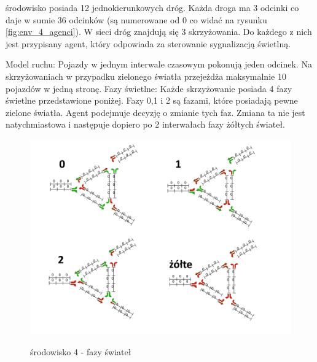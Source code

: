 \documentclass[12pt]{book}
\theoremstyle{plain}
\begin{document}
środowisko posiada 12 jednokierunkowych dróg. Każda droga ma 3 odcinki co daje w sumie 36 odcinków (są numerowane od 0 co widać na rysunku \ref{fig:env_4_agenci}).
W sieci dróg znajdują się 3 skrzyżowania. Do każdego z nich jest przypisany agent, który odpowiada za sterowanie sygnalizacją świetlną.

Model ruchu:
Pojazdy w jednym interwale czasowym pokonują jeden odcinek. Na skrzyżowaniach w przypadku zielonego światła przejeżdża maksymalnie 10 pojazdów w jedną stronę.
Fazy świetlne: Każde skrzyżowanie posiada 4 fazy świetlne przedstawione poniżej. Fazy 0,1 i 2 są fazami, które posiadają pewne zielone światła. Agent podejmuje decyzję o zmianie tych faz. Zmiana ta nie jest natychmiastowa i następuje dopiero po 2 interwałach fazy żółtych 
świateł.

\begin{figure}[H]
	\centering
	\includegraphics[width=14cm]{env_4_fazy}
	\label{fig:env_4_fazy}
	\caption{środowisko 4 - fazy świateł}
\end{figure}
\end{document}
